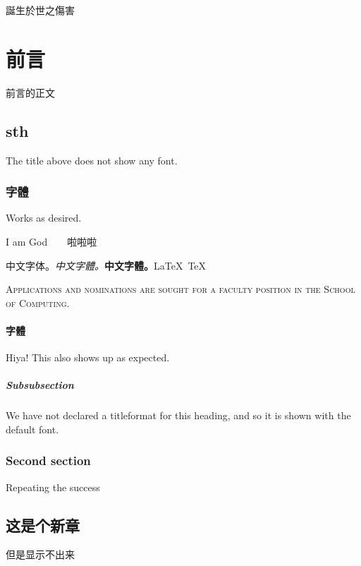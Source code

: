 \documentclass[12pt, UTF8]{ctexbook}
\newcommand{\IMG}{I am God}
\begin{document}

\begin{titlepage}
	
	\vspace{1cm}
	\begin{center}
		{\huge {}}
		
		\vspace{0.1cm}
		
		\Large{\sffamily 誕生於世之傷害}
		
	\end{center}

\end{titlepage}

\part{前言}

前言的正文

\chapter{sth}


The title above does not show any font.

\section{字體}

\sffamily
Works as desired. 

\normalfont

\IMG\ \ \ \  啦啦啦

\rmfamily 
中文字体。\textsl{中文字體。}\textbf{中文字體。}\LaTeX\ \TeX

\textsc{Applications and nominations are sought for a faculty position in the School of Computing.}

\blindtext

\subsection{字體}

Hiya! This also shows up as expected.

\subsubsection{Subsubsection}

We have not declared a titleformat for this heading, and so it is shown with the default font.

\section{Second section}

Repeating the success

\chapter{这是个新章}

但是显示不出来
\end{document}
